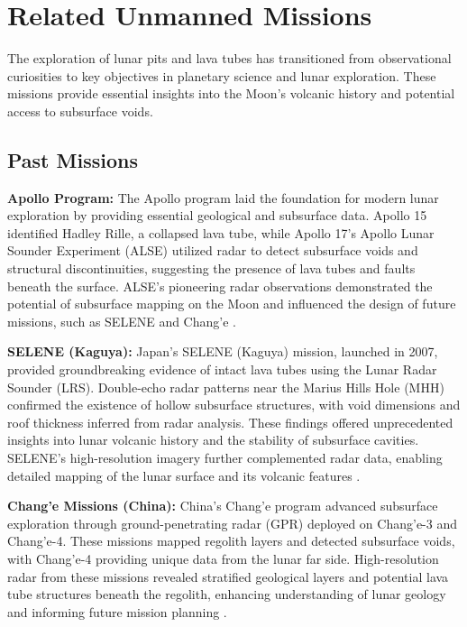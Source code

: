\graphicspath{{img/ch5}}
\section{Related Unmanned Missions}

The exploration of lunar pits and lava tubes has transitioned from observational curiosities to key objectives in planetary science and lunar exploration. These missions provide essential insights into the Moon’s volcanic history and potential access to subsurface voids.

\subsection{Past Missions}

\textbf{Apollo Program:}  
The Apollo program laid the foundation for modern lunar exploration by providing essential geological and subsurface data. Apollo 15 identified Hadley Rille, a collapsed lava tube, while Apollo 17’s Apollo Lunar Sounder Experiment (ALSE) utilized radar to detect subsurface voids and structural discontinuities, suggesting the presence of lava tubes and faults beneath the surface. ALSE's pioneering radar observations demonstrated the potential of subsurface mapping on the Moon and influenced the design of future missions, such as SELENE and Chang’e \cite{radar-observations-lava-tubes}.

\textbf{SELENE (Kaguya):}  
Japan's SELENE (Kaguya) mission, launched in 2007, provided groundbreaking evidence of intact lava tubes using the Lunar Radar Sounder (LRS). Double-echo radar patterns near the Marius Hills Hole (MHH) confirmed the existence of hollow subsurface structures, with void dimensions and roof thickness inferred from radar analysis. These findings offered unprecedented insights into lunar volcanic history and the stability of subsurface cavities. SELENE’s high-resolution imagery further complemented radar data, enabling detailed mapping of the lunar surface and its volcanic features \cite{cavities-selene-lavatubes, radar-observations-lava-tubes}.

\textbf{Chang’e Missions (China):}  
China’s Chang’e program advanced subsurface exploration through ground-penetrating radar (GPR) deployed on Chang’e-3 and Chang’e-4. These missions mapped regolith layers and detected subsurface voids, with Chang’e-4 providing unique data from the lunar far side. High-resolution radar from these missions revealed stratified geological layers and potential lava tube structures beneath the regolith, enhancing understanding of lunar geology and informing future mission planning \cite{radar-observations-lava-tubes, cavities-selene-lavatubes}.

